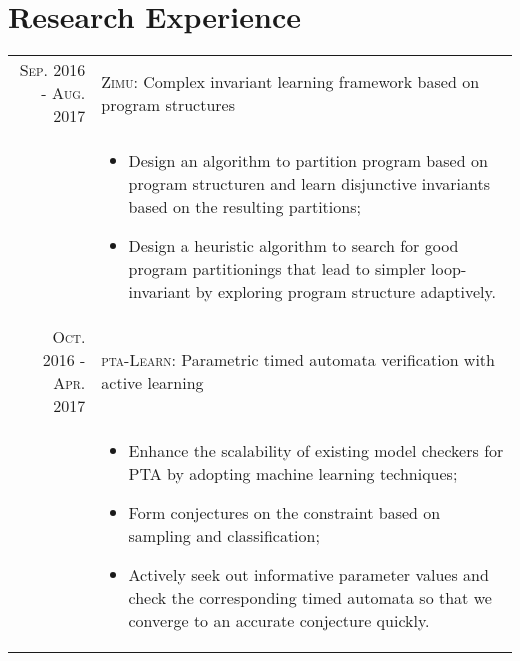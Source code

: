 \documentclass[a4paper,10pt]{article}
\begin{document}
\section{Research Experience}
\begin{tabular}{rp{11cm}}
\textsc{Sep.} 2016 - \textsc{Aug.} 2017 & \textsc{Zimu:} \footnotesize{Complex invariant learning framework based on program structures}\\
&\footnotesize{
\begin{itemize}
	\item Design an algorithm to partition program based on program structuren and learn disjunctive invariants based on the resulting partitions;
	\item Design a heuristic algorithm to search for good program partitionings that lead to simpler loop-invariant by exploring program structure adaptively.
\end{itemize}
} \\


\textsc{Oct.} 2016 - \textsc{Apr.} 2017 & \textsc{pta-Learn:} \footnotesize{Parametric timed automata verification with active learning}\\
&\footnotesize{
\begin{itemize}
	\item Enhance the scalability of existing model checkers for PTA by adopting machine learning techniques;
	\item Form conjectures on the constraint based on sampling and classification; 
	\item Actively seek out informative parameter values and check the corresponding timed automata so that we converge to an accurate conjecture quickly.
\end{itemize}
} \\



\end{tabular}
\end{document}
